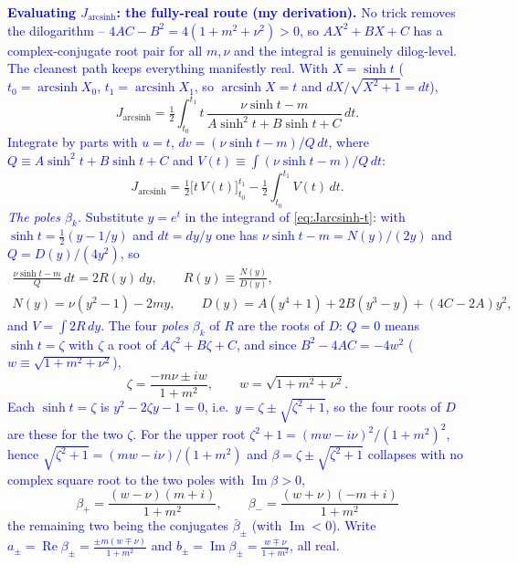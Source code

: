 \documentclass[11pt]{article}
\numberwithin{equation}{section}
\newcommand{\half}{\tfrac{1}{2}}
\DeclareMathOperator{\arcsinh}{arcsinh}
\newcommand{\cam}[1]{\textcolor{blue}{#1}}
\begin{document}
\cam{\textbf{Evaluating $J_{\arcsinh}$: the fully-real route (my derivation).} No trick removes the
dilogarithm -- $4AC-B^2=4(1+m^2+\nu^2)>0$, so $AX^2+BX+C$ has a complex-conjugate root pair for all
$m,\nu$ and the integral is genuinely dilog-level. The cleanest path keeps everything manifestly real.
With $X=\sinh t$ ($t_0=\arcsinh X_0$, $t_1=\arcsinh X_1$, so $\arcsinh X=t$ and $dX/\sqrt{X^2+1}=dt$),}
\begin{equation}\label{eq:Jarcsinh-t}
  J_{\arcsinh}=\half\int_{t_0}^{t_1}t\,\frac{\nu\sinh t-m}{A\sinh^2 t+B\sinh t+C}\,dt .
\end{equation}
\cam{Integrate by parts with $u=t$, $dv=(\nu\sinh t-m)/Q\,dt$, where $Q\equiv A\sinh^2 t+B\sinh t+C$ and
$V(t)\equiv\int(\nu\sinh t-m)/Q\,dt$:}
\begin{equation}\label{eq:Jarcsinh-ibp}
  J_{\arcsinh}=\half\big[t\,V(t)\big]_{t_0}^{t_1}-\half\int_{t_0}^{t_1}V(t)\,dt .
\end{equation}
\cam{\emph{The poles $\beta_k$.} Substitute $y=e^t$ in the integrand of \eqref{eq:Jarcsinh-t}: with
$\sinh t=\tfrac12(y-1/y)$ and $dt=dy/y$ one has $\nu\sinh t-m=N(y)/(2y)$ and $Q=D(y)/(4y^2)$, so}
\begin{equation}\label{eq:Rdef}
\begin{gathered}
  \frac{\nu\sinh t-m}{Q}\,dt=2R(y)\,dy,\qquad R(y)\equiv\frac{N(y)}{D(y)},\\
  N(y)=\nu(y^2-1)-2my,\qquad D(y)=A(y^4+1)+2B(y^3-y)+(4C-2A)y^2 ,
\end{gathered}
\end{equation}
\cam{and $V=\int 2R\,dy$. The four \emph{poles} $\beta_k$ of $R$ are the roots of $D$: $Q=0$ means
$\sinh t=\zeta$ with $\zeta$ a root of $A\zeta^2+B\zeta+C$, and since $B^2-4AC=-4w^2$
($w\equiv\sqrt{1+m^2+\nu^2}$),}
\begin{equation}\label{eq:sroots}
  \zeta=\frac{-m\nu\pm iw}{1+m^2},\qquad w=\sqrt{1+m^2+\nu^2}.
\end{equation}
\cam{Each $\sinh t=\zeta$ is $y^2-2\zeta y-1=0$, i.e.\ $y=\zeta\pm\sqrt{\zeta^2+1}$, so the four roots of $D$
are these for the two $\zeta$. For the upper root $\zeta^2+1=(mw-i\nu)^2/(1+m^2)^2$, hence
$\sqrt{\zeta^2+1}=(mw-i\nu)/(1+m^2)$ and $\beta=\zeta\pm\sqrt{\zeta^2+1}$ collapses with no complex square
root to the two poles with $\operatorname{Im}\beta>0$,}
\begin{equation}\label{eq:betapm}
  \beta_+=\frac{(w-\nu)(m+i)}{1+m^2},\qquad \beta_-=\frac{(w+\nu)(-m+i)}{1+m^2}
\end{equation}
\cam{the remaining two being the conjugates $\bar\beta_\pm$ (with $\operatorname{Im}<0$). Write
$a_\pm=\operatorname{Re}\beta_\pm=\tfrac{\pm m(w\mp\nu)}{1+m^2}$ and
$b_\pm=\operatorname{Im}\beta_\pm=\tfrac{w\mp\nu}{1+m^2}$, all real.}
\end{document}
